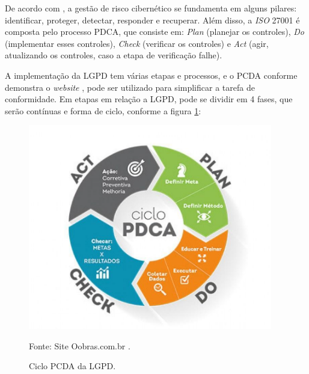 \documentclass[
	12pt,				%
	openright,			%
	oneside,			%
	a4paper,			%
	english,			%
	french,				%
	spanish,			%
	brazil,				%
	]{abntex2}
\begin{document}
De acordo com , a gestão de risco cibernético se fundamenta em alguns pilares: identificar, proteger, detectar, responder e recuperar. Além disso, a \textit{ISO} 27001 é composta pelo processo PDCA, que consiste em: \textit{Plan} (planejar os controles), \textit{Do} (implementar esses controles), \textit{Check} (verificar os controles) e \textit{Act} (agir, atualizando os controles, caso a etapa de verificação falhe).

A implementação da LGPD tem várias etapas e processos, e o PCDA conforme demonstra o \textit{website} \cite{minutoseguraca}, pode ser utilizado para simplificar a tarefa de conformidade. Em etapas em relação a LGPD, pode se dividir em 4 fases, que serão contínuas e forma de ciclo, conforme a figura \ref{fig: PCDA }:

\begin{figure}[ht]
    \centering
    \caption{Ciclo PCDA da LGPD.}
    \includegraphics[width=4.2in]{Images/05PCDA.png}
    
    \label{fig: PCDA }
    \centering \small Fonte: Site Oobras.com.br \cite{oobras}.
\end{figure}
\end{document}
